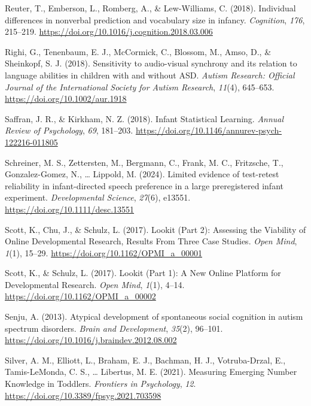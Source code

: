 \documentclass[
  english,
  man,floatsintext]{apa6}
\newlength{\cslhangindent}
\newenvironment{CSLReferences}[2] %
 {\begin{list}{}{%
  \setlength{\itemindent}{0pt}
  \setlength{\leftmargin}{0pt}
  \setlength{\parsep}{0pt}
  \ifodd #1
   \setlength{\leftmargin}{\cslhangindent}
   \setlength{\itemindent}{-1\cslhangindent}
  \fi
  \setlength{\itemsep}{#2\baselineskip}}}
 {\end{list}}
\begin{document}
\begin{CSLReferences}{1}{0}
Reuter, T., Emberson, L., Romberg, A., \& Lew-Williams, C. (2018). Individual differences in nonverbal prediction and vocabulary size in infancy. \emph{Cognition}, \emph{176}, 215--219. \url{https://doi.org/10.1016/j.cognition.2018.03.006}

Righi, G., Tenenbaum, E. J., McCormick, C., Blossom, M., Amso, D., \& Sheinkopf, S. J. (2018). Sensitivity to audio-visual synchrony and its relation to language abilities in children with and without {ASD}. \emph{Autism Research: Official Journal of the International Society for Autism Research}, \emph{11}(4), 645--653. \url{https://doi.org/10.1002/aur.1918}

Saffran, J. R., \& Kirkham, N. Z. (2018). Infant {Statistical Learning}. \emph{Annual Review of Psychology}, \emph{69}, 181--203. \url{https://doi.org/10.1146/annurev-psych-122216-011805}

Schreiner, M. S., Zettersten, M., Bergmann, C., Frank, M. C., Fritzsche, T., Gonzalez-Gomez, N., \ldots{} Lippold, M. (2024). Limited evidence of test-retest reliability in infant-directed speech preference in a large preregistered infant experiment. \emph{Developmental Science}, \emph{27}(6), e13551. \url{https://doi.org/10.1111/desc.13551}

Scott, K., Chu, J., \& Schulz, L. (2017). Lookit ({Part} 2): {Assessing} the {Viability} of {Online Developmental Research}, {Results From Three Case Studies}. \emph{Open Mind}, \emph{1}(1), 15--29. \url{https://doi.org/10.1162/OPMI_a_00001}

Scott, K., \& Schulz, L. (2017). Lookit ({Part} 1): {A New Online Platform} for {Developmental Research}. \emph{Open Mind}, \emph{1}(1), 4--14. \url{https://doi.org/10.1162/OPMI_a_00002}

Senju, A. (2013). Atypical development of spontaneous social cognition in autism spectrum disorders. \emph{Brain and Development}, \emph{35}(2), 96--101. \url{https://doi.org/10.1016/j.braindev.2012.08.002}

Silver, A. M., Elliott, L., Braham, E. J., Bachman, H. J., Votruba-Drzal, E., Tamis-LeMonda, C. S., \ldots{} Libertus, M. E. (2021). Measuring {Emerging Number Knowledge} in {Toddlers}. \emph{Frontiers in Psychology}, \emph{12}. \url{https://doi.org/10.3389/fpsyg.2021.703598}


\end{CSLReferences}
\end{document}
